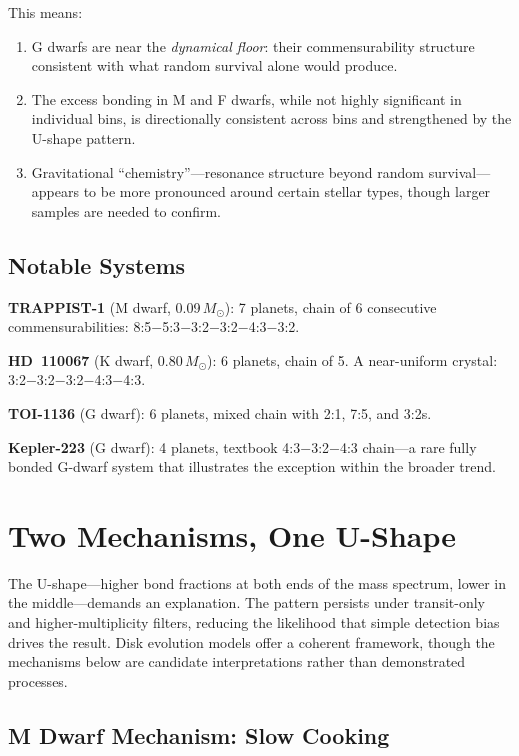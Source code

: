 \documentclass[twocolumn]{aastex631}
\begin{document}
This means:

\begin{enumerate}
  \item G dwarfs are near the \textit{dynamical floor}: their commensurability
        structure consistent with what random survival alone would produce.
  \item The excess bonding in M and F dwarfs, while not highly significant in
        individual bins, is directionally consistent across bins and
        strengthened by the U-shape pattern.
  \item Gravitational ``chemistry''---resonance structure beyond random
        survival---appears to be more pronounced around certain stellar types,
        though larger samples are needed to confirm.
\end{enumerate}

\subsection{Notable Systems}

\textbf{TRAPPIST-1} (M dwarf, 0.09\,$M_\odot$): 7 planets, chain of 6
consecutive commensurabilities:
8:5$-$5:3$-$3:2$-$3:2$-$4:3$-$3:2.

\textbf{HD~110067} (K dwarf, 0.80\,$M_\odot$): 6 planets, chain of 5. A
near-uniform crystal: 3:2$-$3:2$-$3:2$-$4:3$-$4:3.

\textbf{TOI-1136} (G dwarf): 6 planets, mixed chain with 2:1, 7:5, and 3:2s.

\textbf{Kepler-223} (G dwarf): 4 planets, textbook 4:3$-$3:2$-$4:3 chain---a
rare fully bonded G-dwarf system that illustrates the exception within the
broader trend.

\section{Two Mechanisms, One U-Shape}
\label{sec:mechanisms}

The U-shape---higher bond fractions at both ends of the mass spectrum, lower
in the middle---demands an explanation. The pattern persists under transit-only and higher-multiplicity filters, reducing
the likelihood that simple detection bias drives the result.
Disk evolution models offer a coherent framework, though the mechanisms below are
candidate interpretations rather than demonstrated processes.

\subsection{M Dwarf Mechanism: Slow Cooking}
\end{document}
